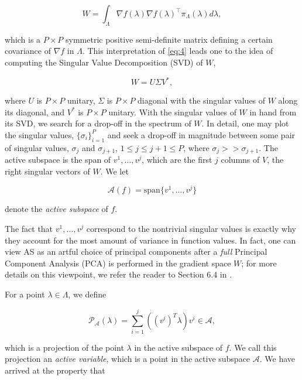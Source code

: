 \documentclass{amsart}
\newcommand{\A}{\mathcal{A}}
\begin{document}
\begin{equation} \label{eq:4}
W=\int_\Lambda \nabla f(\lambda) \nabla f(\lambda)^\top  \pi_\Lambda(\lambda) d\lambda,
\end{equation} 

\noindent which is a $P\times P$ symmetric positive semi-definite matrix defining a certain covariance of $\nabla f$ in $\Lambda$. This interpretation of \eqref{eq:4} leads one to the idea of computing the Singular Value Decomposition (SVD) of $W$,

\begin{equation} \label{eq:5}
W=U\Sigma V^*,
\end{equation} 

\noindent where $U$ is $P \times P$ unitary, $\Sigma$ is $P \times P$ diagonal with the singular values of $W$ along its diagonal, and $V^*$ is $P \times P$ unitary. With the singular values of $W$ in hand from its SVD, we search for a drop-off in the spectrum of $W$. In detail, one may plot the singular values, $\{\sigma_i\}_{i=1}^P$ and seek a drop-off in magnitude between some pair of singular values, $\sigma_{j}$ and $\sigma_{j+1}$, $1\leq j \leq j+1 \leq P$, where $\sigma_{j}>>\sigma_{j+1}$. The active subspace is the span of $v^1,\ldots,v^{j}$, which are the first $j$ columns of $V$, the right singular vectors of $W$. We let

\begin{equation} \label{eq:6}
\A(f)=\text{span}\{v^1,\ldots,v^j\}
\end{equation}

\noindent denote the \textit{active subspace} of $f$.


The fact that $v^1,\ldots,v^{j}$ correspond to the nontrivial singular values is exactly why they account for the most amount of variance in function values. In fact, one can view AS as an artful choice of principal components after a \textit{full} Principal Component Analysis (PCA) is performed in the gradient space $W$; for more details on this viewpoint, we refer the reader to Section 6.4 in \cite{Russi}.

For a point $\lambda \in \Lambda$, we define

\begin{equation} \label{eq:7}
  \mathcal{P}_\A(\lambda)=\sum_{i=1}^{j}\left( ({v^i})^T \lambda\right)v^i \in \A, 
\end{equation}

\noindent which is a projection of the point $\lambda$ in the active subspace of $f$. We call this projection an \textit{active variable}, which is a point in the active subspace $\A$. We have arrived at the property that 
\end{document}
